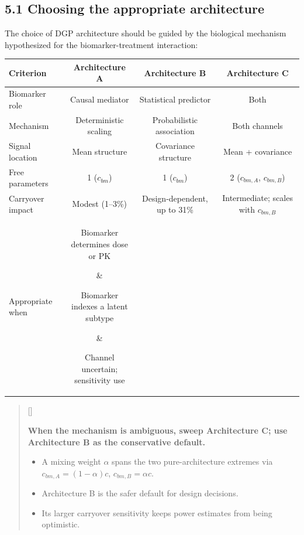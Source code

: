 \documentclass[
  11pt,
]{article}
\newcounter{pgraph}
\newenvironment{bullets}{%
  \stepcounter{pgraph}%
  \begin{quote}\small\sffamily\color[gray]{0.30}%
  {\normalfont\scriptsize\color[gray]{0.58}[\thepgraph]\enspace}}{%
  \end{quote}}
\begin{document}
\subsection{5.1 Choosing the appropriate architecture}

The choice of DGP architecture should be guided by the biological
mechanism hypothesized for the biomarker-treatment interaction:

\begin{table}[htbp]
\centering
\begin{tabular}{lccc}
\toprule
Criterion & Architecture A & Architecture B & Architecture C \\
\midrule
Biomarker role & Causal mediator & Statistical predictor &
  Both \\
Mechanism & Deterministic scaling & Probabilistic association &
  Both channels \\
Signal location & Mean structure & Covariance structure &
  Mean + covariance \\
Free parameters & 1 ($c_{bm}$) & 1 ($c_{bm}$) &
  2 ($c_{bm,A}$, $c_{bm,B}$) \\
Carryover impact & Modest (1--3\%) &
  Design-dependent, up to 31\% &
  Intermediate; scales with $c_{bm,B}$ \\
Appropriate when &
  \parbox[t]{2.5cm}{Biomarker\\determines dose\\or PK} &
  \parbox[t]{2.5cm}{Biomarker\\indexes a latent\\subtype} &
  \parbox[t]{2.5cm}{Channel\\uncertain;\\sensitivity use} \\
\bottomrule
\end{tabular}
\end{table}

\begin{bullets}

\textbf{When the mechanism is ambiguous, sweep Architecture C; use
Architecture B as the conservative default.}

\begin{itemize}\setlength{\itemsep}{2pt}\setlength{\parskip}{0pt}
\item A mixing weight $\alpha$ spans the two pure-architecture
extremes via $c_{bm,A} = (1-\alpha)c$, $c_{bm,B} = \alpha c$.
\item Architecture B is the safer default for design decisions.
\item Its larger carryover sensitivity keeps power estimates from
being optimistic.
\end{itemize}

\end{bullets}
\end{document}
